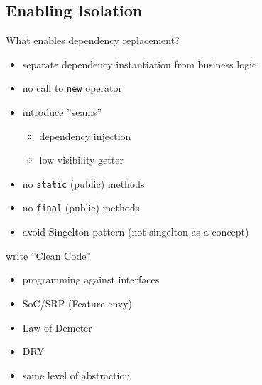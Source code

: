 \documentclass[SoftwareQuality.tex]{subfiles}
\begin{document}
\subsection{Enabling Isolation}
\begin{frame}{What enables dependency replacement?} 
	\begin{itemize}
		\item separate dependency instantiation from business logic
		\item no call to \texttt{new} operator
		\item introduce ''seams''
			\begin{itemize}
				\item dependency injection
				\item low visibility getter
			\end{itemize}
		\item no \texttt{static} (public) methods
		\item no \texttt{final} (public) methods
		\item avoid Singelton pattern (not singelton as a concept)
	\end{itemize}
\end{frame}

\begin{frame}{write ''Clean Code''\footnotemark[1]} 
	\begin{itemize}
		\item programming against interfaces
		\item SoC/SRP (Feature envy)
		\item Law of Demeter
		\item DRY
		\item same level of abstraction
	\end{itemize}
\end{frame}
\end{document}
